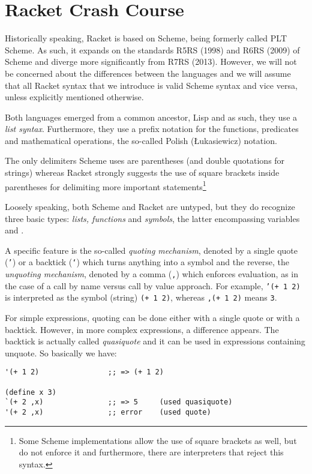 \chapter{Racket Crash Course}

Historically speaking, Racket is based on Scheme, being formerly called
PLT Scheme. As such, it expands on the standards R5RS (1998) and R6RS (2009)
of Scheme and diverge more significantly from R7RS (2013). However, we will
not be concerned about the differences between the languages and we will
assume that all Racket syntax that we introduce is valid Scheme syntax and
vice versa, unless explicitly mentioned otherwise.

Both languages emerged from a common ancestor, Lisp and as such, they
use a \emph{list syntax}. Furthermore, they use a prefix notation
for the functions, predicates and mathematical operations, the so-called
Polish ({\L}ukasiewicz) notation.

The only delimiters Scheme uses are parentheses (and double quotations
for strings) whereas Racket strongly suggests the use of square brackets
inside parentheses for delimiting more important statements\footnote{Some %
  Scheme implementations allow the use of square brackets as well, but
  do not enforce it and furthermore, there are interpreters that reject
  this syntax.}

Loosely speaking, both Scheme and Racket are untyped, but they do recognize
three basic types: \emph{lists, functions} and \emph{symbols}, the
latter encompassing variables and .

A specific feature is the so-called \emph{quoting mechanism}, denoted
by a single quote (\texttt{'}) or a backtick (\texttt{`}) which
turns anything into a symbol and the reverse, the \emph{unquoting mechanism},
denoted by a comma (\texttt{,}) which enforces evaluation, as in the
case of a call by name versus call by value approach. For example,
\texttt{'(+ 1 2)} is interpreted as the symbol (string) \texttt{(+ 1 2)},
whereas \texttt{,(+ 1 2)} means \texttt{3}.

For simple expressions, quoting can be done either with a single
quote or with a backtick. However, in more complex expressions,
a difference appears. The backtick is actually called
\emph{quasiquote} and it can be used in expressions containing
unquote. So basically we have:
{
  \small
\begin{verbatim}
'(+ 1 2)                ;; => (+ 1 2)

(define x 3)
`(+ 2 ,x)               ;; => 5     (used quasiquote)
'(+ 2 ,x)               ;; error    (used quote)
\end{verbatim}
}

